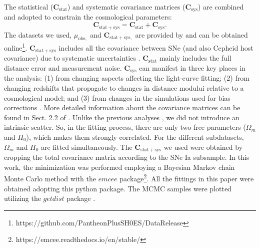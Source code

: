 \documentclass{aa}
\begin{document}
The statistical ($\mathbf{C}_\mathrm{stat}$) and systematic covariance matrices ($\mathbf{C}_\mathrm{sys}$) are combined and adopted to constrain the cosmological parameters: 
\begin{equation}
    \mathbf{C}_\mathrm{stat+sys} = \mathbf{C}_\mathrm{stat} +  \mathbf{C}_\mathrm{sys}.
        \label{C}
\end{equation}
The datasets we used, $\mu_\mathrm{obs,}$ and $\mathbf{C}_\mathrm{stat+sys,}$ are provided by \citet{2022ApJ...938..110B} and can be obtained online\footnote{https://github.com/PantheonPlusSH0ES/DataRelease}. $\mathbf{C}_\mathrm{stat+sys}$ includes all the covariance between SNe (and also Cepheid host covariance) due to systematic uncertainties \citep{2022ApJ...938..110B}. $\mathbf{C}_\mathrm{stat}$ mainly includes the full distance error and measurement noise. $\mathbf{C}_\mathrm{sys}$ can manifest in three key places in the analysis: (1) from changing aspects affecting the light-curve fitting; (2) from changing redshifts that propagate to changes in distance modului relative to a cosmological model; and (3) from changes in the simulations used for bias corrections \citep{2022ApJ...938..110B}. More detailed information about the covariance matrices can be found in Sect. 2.2 of \citet{2022ApJ...938..110B}. Unlike the previous analyses \citep{2014A&A...568A..22B,2019A&A...631L..13C}, we did not introduce an intrinsic scatter. So, in the fitting process, there are only two free parameters ($\Omega_{m}$ and $H_{0}$), which makes them strongly correlated. For the different subdatasets, $\Omega_{m}$ and $H_{0}$ are fitted simultaneously. The $\mathbf{C}_\mathrm{stat+sys}$ we used were obtained by cropping the total covariance matrix according to the SNe Ia subsample. In this work, the minimization was performed employing a Bayesian Markov chain Monte Carlo \citep[MCMC;][]{2013PASP..125..306F} method with the $emcee$ package\footnote{https://emcee.readthedocs.io/en/stable/}. All the fittings in this paper were obtained adopting this python package. The MCMC samples were plotted utilizing the $getdist$ package \citep{2019arXiv191013970L}.
\end{document}
